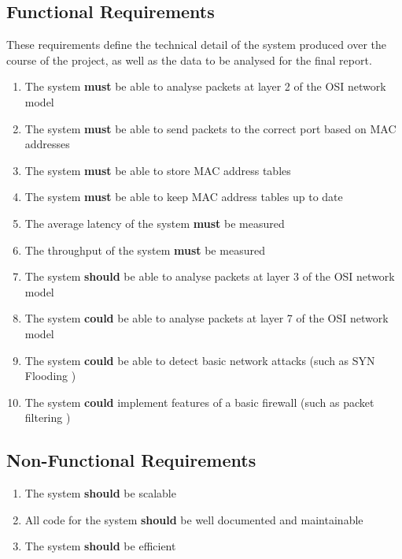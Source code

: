 \documentclass[12pt, a4paper, twoside, onecolumn]{article}
\begin{document}
\subsection{Functional Requirements}
\label{functional_requirements}

These requirements define the technical detail of the system produced over the course of the project, as well as the data to be analysed for the final report.
\begin{enumerate}[label=\textbf{F\arabic*:}]
  \item The system \textbf{must} be able to analyse packets at layer 2 of the OSI network model
  \item The system \textbf{must} be able to send packets to the correct port based on MAC addresses
  \item The system \textbf{must} be able to store MAC address tables
  \item The system \textbf{must} be able to keep MAC address tables up to date
  \item The average latency of the system \textbf{must} be measured
  \item The throughput of the system \textbf{must} be measured
  \item The system \textbf{should} be able to analyse packets at layer 3 of the OSI network model
  \item The system \textbf{could} be able to analyse packets at layer 7 of the OSI network model
  \item The system \textbf{could} be able to detect basic network attacks (such as SYN Flooding \cite{rfc4987})
  \item The system \textbf{could} implement features of a basic firewall (such as packet filtering \cite{rfc2979})
\end{enumerate}

\subsection{Non-Functional Requirements}
\label{non_functional_requirements}
\begin{enumerate}[label=\textbf{NF\arabic*:}]
  \item The system \textbf{should} be scalable
  \item All code for the system \textbf{should} be well documented and maintainable
  \item The system \textbf{should} be efficient
\end{enumerate}
\end{document}
